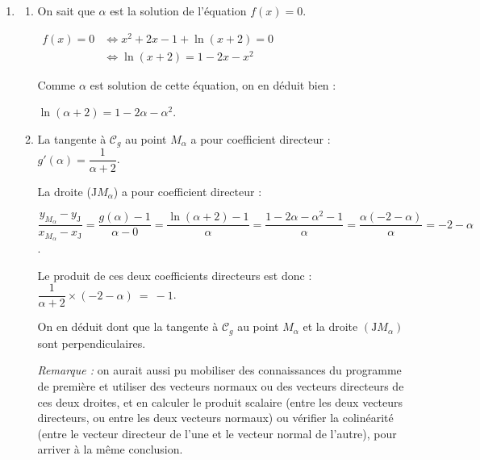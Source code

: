 \documentclass[10pt]{article}
\begin{document}
\begin{enumerate}
\item \begin{enumerate}
	\item On sait que $\alpha$ est la solution de l'équation $f(x) = 0$.

	$\begin{aligned} f(x) = 0 &\iff x^2 + 2x - 1 + \ln(x+2) = 0\\
	&\iff \ln(x+2) = 1 - 2x -x^2 \end{aligned}$

	Comme $\alpha$ est solution de cette équation, on en déduit bien :

	$\ln (\alpha+2)=1-2 \alpha-\alpha^{2}$.

	\item La tangente à $\mathcal{C}_g$ au point $M_\alpha$ a pour coefficient directeur :\quad $g'(\alpha) = \dfrac{1}{\alpha + 2}$.

	La droite (J$M_\alpha$) a pour coefficient directeur :

	$\dfrac{y_{M_\alpha} - y_\mathrm{J}}{x_{M_\alpha} - x_\mathrm{J}} = \dfrac{g(\alpha) - 1}{\alpha - 0} = \dfrac{\ln(\alpha + 2)-1}{\alpha} = \dfrac{1 - 2\alpha - \alpha^2 - 1}{\alpha} = \dfrac{\alpha (-2 - \alpha)}{\alpha } = -2 - \alpha$.

	Le produit de ces deux coefficients directeurs est donc : \quad $\dfrac{1}{\alpha + 2}\times (-2-\alpha)~=~ -1$.

	On en déduit dont que la tangente à $\mathcal{C}_{g}$ au point $M_{\alpha}$ et la droite $\left(\mathrm{J}M_{\alpha}\right)$ sont perpendiculaires.

	\emph{Remarque :} on aurait aussi pu mobiliser des connaissances du programme de première et utiliser des vecteurs normaux ou des vecteurs directeurs de ces deux droites, et en calculer le produit scalaire (entre les deux vecteurs directeurs, ou entre les deux vecteurs normaux) ou vérifier la colinéarité (entre le vecteur directeur de l'une et le vecteur normal de l'autre), pour arriver à la même conclusion.
\end{enumerate}
\end{enumerate}
\end{document}
